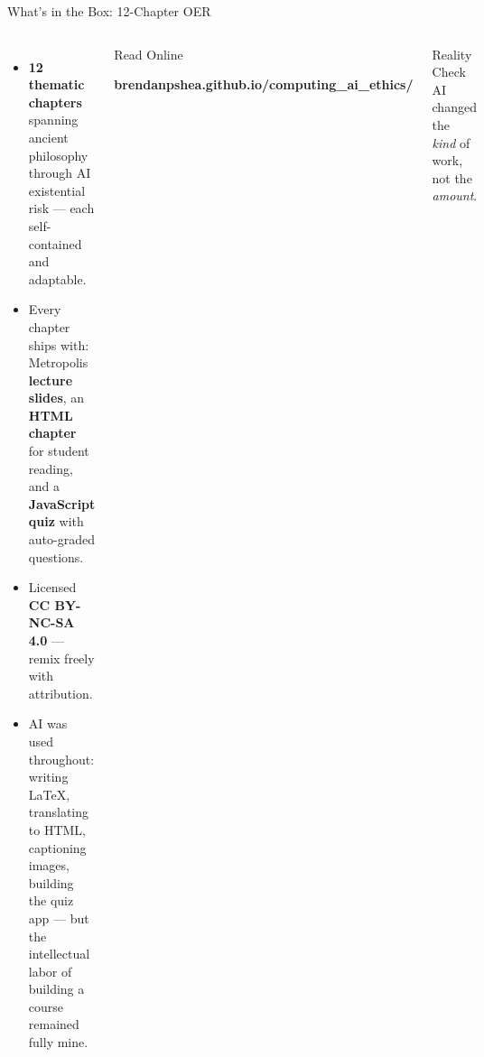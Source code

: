 \documentclass[aspectratio=169,10pt]{beamer}
\begin{document}
\begin{frame}{What's in the Box: 12-Chapter OER}
\begin{columns}[c]
\begin{itemize}
  \item \textbf{12 thematic chapters} spanning ancient philosophy through AI existential risk --- each self-contained and adaptable.
  \item Every chapter ships with: Metropolis \textbf{lecture slides}, an \textbf{HTML chapter} for student reading, and a \textbf{JavaScript quiz} with auto-graded questions.
  \item Licensed \textbf{CC BY-NC-SA 4.0} --- remix freely with attribution.
  \item AI was used throughout: writing \LaTeX{}, translating to HTML, captioning images, building the quiz app --- but the intellectual labor of building a course remained fully mine.
\end{itemize}
\begin{block}{Read Online}
\footnotesize\centering
{}\par\vspace{0.3em}
\textbf{brendanpshea.github.io/\allowbreak computing\_ai\_ethics/}
\end{block}
\vspace{0.25em}
\begin{alertblock}{Reality Check}
\small AI changed the \emph{kind} of work, not the \emph{amount}.
\end{alertblock}
\end{columns}
\end{frame}
\end{document}
